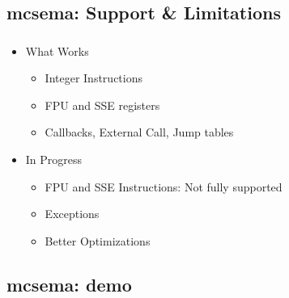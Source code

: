 \documentclass[mathserif,10pt]{beamer}
\begin{document}
  \subsection{mcsema: Support \& Limitations}
  \frame
  {
    \frametitle{\subsecname}
    \begin{itemize}
      \item What Works
        \begin{itemize}
          \item Integer Instructions
          \item FPU and SSE registers
          \item Callbacks, External Call, Jump tables 
        \end{itemize}
      \item In Progress
        \begin{itemize}
          \item FPU and SSE Instructions: Not fully supported
          \item Exceptions
          \item Better Optimizations
        \end{itemize}
    \end{itemize}
  }

  \subsection{mcsema: demo}
  \frame
  {
    \frametitle{\subsecname}
  }
\end{document}
